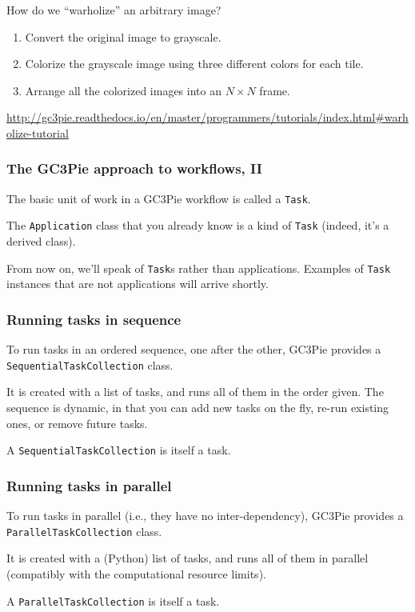 \documentclass[english,serif,mathserif,xcolor=pdftex,dvipsnames,table]{beamer}
\begin{document}
\begin{frame}[fragile]
  How do we ``warholize'' an arbitrary image?

  \+
  \begin{enumerate}
  \item Convert the original image to grayscale.
  \item Colorize the grayscale image using three different colors for each tile.
  \item Arrange all the colorized images into an $N\times N$ frame.
  \end{enumerate}

  \+
  \begin{references}
    \url{http://gc3pie.readthedocs.io/en/master/programmers/tutorials/index.html#warholize-tutorial}
  \end{references}
\end{frame}


\begin{frame}
  \frametitle{The GC3Pie approach to workflows, II}

  The basic unit of work in a GC3Pie workflow is called a \texttt{Task}.

  \+
  The \texttt{Application} class that you already know is a kind of
  \texttt{Task} (indeed, it's a derived class).

  \+
  From now on, we'll speak of \texttt{Task}s rather than
  applications.  Examples of \texttt{Task} instances that are not
  applications will arrive shortly.
\end{frame}


\begin{frame}
  \frametitle{Running tasks in sequence}

  To run tasks in an ordered sequence, one after the other, GC3Pie
  provides a \texttt{SequentialTaskCollection} class.

  \+
  It is created with a list of tasks, and runs all of them in the
  order given.  The sequence is dynamic, in that you can add new tasks
  on the fly, re-run existing ones, or remove future tasks.

  \+
  A \texttt{SequentialTaskCollection} is itself a task.
\end{frame}


\begin{frame}
  \frametitle{Running tasks in parallel}

  To run tasks in parallel (i.e., they have no inter-dependency),
  GC3Pie provides a \texttt{ParallelTaskCollection} class.

  \+
  It is created with a (Python) list of tasks, and runs all of them
  in parallel (compatibly with the computational resource limits).

  \+
  A \texttt{ParallelTaskCollection} is itself a task.

\end{frame}
\end{document}

